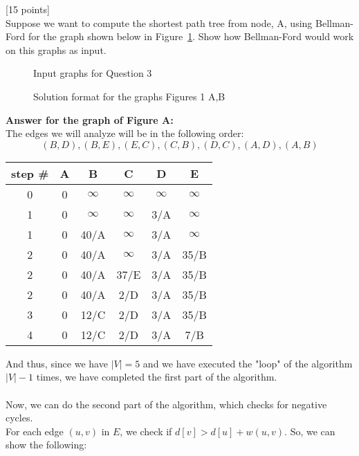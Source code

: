 \documentclass[12pt]{article}
\newcounter{ques}
\newenvironment{question}{\stepcounter{ques}{\noindent\bf Question \arabic{ques}:}}{\vspace{5mm}}
\begin{document}
\begin{question}[15 points]\\
	Suppose we want to compute the shortest path tree from node, A,  using Bellman-Ford for the graph shown below in Figure~\ref{fig:Bellman-Ford}. Show how Bellman-Ford would work on this graphs as input.

\newpage
\begin{figure}
	\centerline{}
	\caption{Input graphs for Question 3}
	\label{fig:Bellman-Ford}
\end{figure}

\begin{figure}
	\centerline{}
	\caption{Solution format for the graphs Figures 1  A,B}
	\label{fig:Bellman-FordTable}
\end{figure}
\textbf{Answer for the graph of Figure A:}\\
The edges we will analyze will be in the following order:
$$(B, D), (B, E), (E, C), (C, B), (D, C), (A, D), (A, B)$$
\begin{center}
  \begin{tabular}{||c | c c c c c||}
   \hline
    step \# & A & B & C & D & E \\ [0.5ex]
   \hline\hline
   0 & 0 & $\infty$ & $\infty$ & $\infty$ & $\infty$\\
   \hline
   1 & 0 & $\infty$ & $\infty$ & 3/A & $\infty$\\
   1 & 0 & 40/A & $\infty$ & 3/A & $\infty$\\
   \hline
   2 & 0 & 40/A & $\infty$ & 3/A & 35/B\\
   2 & 0 & 40/A & 37/E & 3/A & 35/B\\
   2 & 0 & 40/A & 2/D & 3/A & 35/B\\
   \hline
   3 & 0 & 12/C & 2/D & 3/A & 35/B\\
   \hline
   4 & 0 & 12/C & 2/D & 3/A & 7/B\\
   \hline
  \end{tabular}
\end{center}
And thus, since we have $|V|=5$ and we have executed the "loop" of the algorithm $|V|-1$ times, we have completed the first part of the algorithm.\\\\
Now, we can do the second part of the algorithm, which checks for negative cycles.\\
For each edge $(u,v)$ in $E$, we check if $d[v] > d[u] + w(u,v)$. So, we can show the following:

\end{question}
\end{document}
